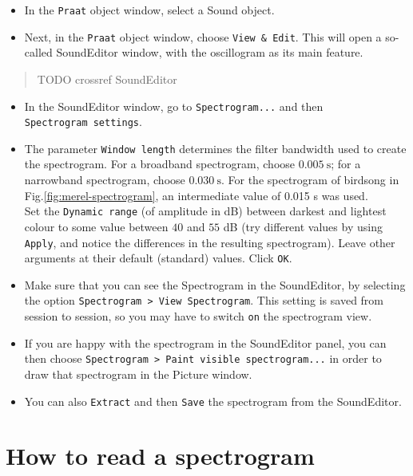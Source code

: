 \documentclass[
]{book}
\begin{document}
\begin{itemize}
\item
  In the \texttt{Praat} object window, select a Sound object.
\item
  Next, in the \texttt{Praat} object window, choose \texttt{View\ \&\ Edit}. This will open a so-called SoundEditor window, with the oscillogram as its main feature.
\end{itemize}

\begin{quote}
TODO crossref SoundEditor
\end{quote}

\begin{itemize}
\item
  In the SoundEditor window, go to \texttt{Spectrogram...} and then \texttt{Spectrogram\ settings}.
\item
  The parameter \texttt{Window\ length} determines the filter bandwidth used to create the spectrogram. For a broadband spectrogram, choose \(0.005\ \textrm{s}\); for a narrowband spectrogram, choose \(0.030\ \textrm{s}\).
  For the spectrogram of birdsong in Fig.\ref{fig:merel-spectrogram}, an intermediate value of 0.015 s was used.\\
  Set the \texttt{Dynamic\ range} (of amplitude in dB) between darkest and lightest colour to some value between \(40\) and \(55\) dB (try different values by using \texttt{Apply}, and notice the differences in the resulting spectrogram).
  Leave other arguments at their default (standard) values. Click \texttt{OK}.
\item
  Make sure that you can see the Spectrogram in the SoundEditor, by selecting the option \texttt{Spectrogram\ \textgreater{}\ View\ Spectrogram}. This setting is saved from session to session, so you may have to switch \texttt{on} the spectrogram view.
\item
  If you are happy with the spectrogram in the SoundEditor panel, you can then choose \texttt{Spectrogram\ \textgreater{}\ Paint\ visible\ spectrogram...} in order to draw that spectrogram in the Picture window.
\item
  You can also \texttt{Extract} and then \texttt{Save} the spectrogram from the SoundEditor.
\end{itemize}

\section{How to read a spectrogram}\label{how-to-read-a-spectrogram}
\end{document}
